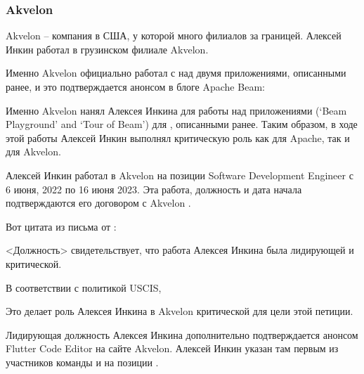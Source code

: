 \subsubsection{Akvelon}
\label{subsubsec:RoleAkvelon}


Akvelon -- компания в США, у которой много филиалов за границей.
Алексей Инкин работал в грузинском филиале Akvelon.

Именно Akvelon официально работал с \Asf над двумя приложениями,
описанными ранее, и это подтверждается анонсом в блоге Apache Beam:


Именно Akvelon нанял Алексея Инкина для работы над приложениями (`Beam Playground' and `Tour of Beam')
для \Asf, описанными ранее.
Таким образом, в ходе этой работы Алексей Инкин выполнял критическую роль как для Apache, так и для Akvelon.


Алексей Инкин работал в Akvelon на позиции Software Development Engineer с 6 июня, 2022 по 16 июня 2023.
Эта работа, должность и дата начала подтверждаются его договором с Akvelon .



Вот цитата из письма от \MrAkvelonT:


<Должность> свидетельствует, что работа Алексея Инкина была лидирующей и критической.

В соответствии с политикой USCIS,


Это делает роль Алексея Инкина в Akvelon критической для цели этой петиции.

Лидирующая должность Алексея Инкина дополнительно подтверждается анонсом Flutter Code Editor
на сайте Akvelon. Алексей Инкин указан там первым из участников команды
и на позиции  .

